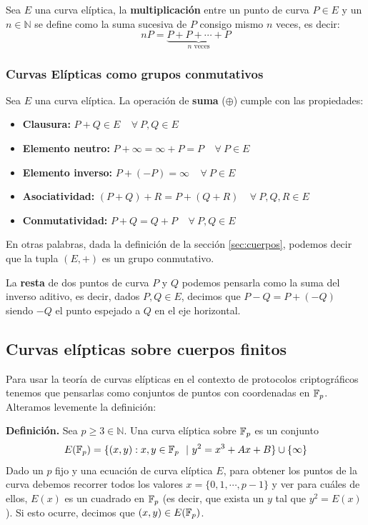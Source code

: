 \vspace{1em}

Sea $E$ una curva elíptica, la \textbf{multiplicación} entre un punto de curva $P\in E$ y un $n \in \mathbb{N}$ se define como la suma sucesiva de $P$ consigo mismo $n$ veces, es decir: 
\[
nP =  \underbrace{P+ P + \cdots + P}_{\text{$n$ veces}}
\]

\subsubsection{\textbf{Curvas Elípticas como grupos conmutativos}}
Sea $E$ una curva elíptica. La operación de \textbf{suma} ($\oplus$) cumple con las propiedades:
\begin{itemize}
    \item \textbf{Clausura:} $P + Q \in E ~~~~~ \forall ~P,Q\in E$
    \item \textbf{Elemento neutro:} $P + \infty = \infty + P = P ~~~~~ \forall ~P\in E$
    \item \textbf{Elemento inverso:} $P + (-P) = \infty ~~~~~ \forall ~P\in E$
    \item \textbf{Asociatividad:} $(P + Q) + R = P + (Q + R) ~~~~~ \forall ~P,Q,R\in E$
    \item \textbf{Conmutatividad:} $P + Q = Q + P ~~~~~ \forall ~P,Q\in E$
\end{itemize}

En otras palabras, dada la definición de la sección \ref{sec:cuerpos}, podemos decir que la tupla $(E, +)$ es un grupo conmutativo.

La \textbf{resta} de dos puntos de curva $P$ y $Q$ podemos pensarla como la suma del inverso aditivo, es decir, dados $P,Q\in E$, decimos que $P-Q = P + (-Q)$ siendo $-Q$ el punto espejado a $Q$ en el eje horizontal.

\subsection{Curvas elípticas sobre cuerpos finitos}
Para usar la teoría de curvas elípticas en el contexto de protocolos criptográficos tenemos que pensarlas como conjuntos de puntos con coordenadas en $\mathbb{F}_p$. Alteramos levemente la definición:

\vspace{1em}

\textbf{Definición.} Sea $p \geq 3\in \mathbb{N}$. Una curva elíptica sobre $\mathbb{F}_p$ es un conjunto 
$$E(\mathbb{F}_p) = \{(x,y):x,y\in\mathbb{F}_p\ ~|~ y^2 = x^3+Ax+B\} \cup \{\infty\}$$
Dado un $p$ fijo y una ecuación de curva elíptica $E$, para obtener los puntos de la curva debemos recorrer todos los valores $x = \{0,1, \cdots, p-1\}$ y ver para cuáles de ellos, $E(x)$ es un cuadrado en $\mathbb{F}_p$ (es decir, que exista un $y$ tal que $y^2 = E(x)$). Si esto ocurre, decimos que $(x,y) \in E(\mathbb{F}_p)$.

